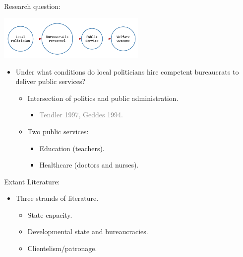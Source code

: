 \documentclass[ignorenonframetext,]{beamer}
\providecommand{\tightlist}{%
  \setlength{\itemsep}{0pt}\setlength{\parskip}{0pt}}
\begin{document}
\begin{frame}{Research question:}

\center

\begin{center}\includegraphics[width=270px]{dag} \end{center}

\justifying

\begin{itemize}[<+->]
\tightlist
\item
  Under what conditions do local politicians hire competent bureaucrats
  to deliver public services?

  \begin{itemize}[<+->]
  \tightlist
  \item
    Intersection of politics and public administration.

    \begin{itemize}[<+->]
    \tightlist
    \item
      \textcolor{gray}{Tendler 1997, Geddes 1994.}
    \end{itemize}
  \item
    Two public services:

    \begin{itemize}[<+->]
    \tightlist
    \item
      Education (teachers).
    \item
      Healthcare (doctors and nurses).
    \end{itemize}
  \end{itemize}
\end{itemize}

\end{frame}

\begin{frame}{Extant Literature:}

\begin{itemize}[<+->]
\tightlist
\item
  Three strands of literature.

  \begin{itemize}[<+->]
  \tightlist
  \item
    State capacity.
  \item
    Developmental state and bureaucracies.
  \item
    Clientelism/patronage.
  \end{itemize}
\end{itemize}

\end{frame}
\end{document}
